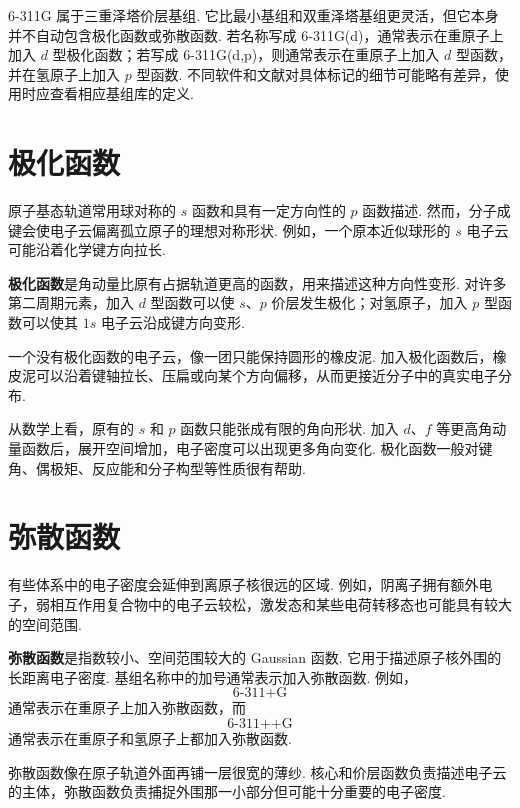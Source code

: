 \documentclass[UTF8,11pt,a4paper,openany]{ctexbook}
\newcommand{\term}[1]{\textbf{#1}}
\begin{document}
6-311G 属于三重泽塔价层基组. 它比最小基组和双重泽塔基组更灵活，但它本身并不自动包含极化函数或弥散函数. 若名称写成 6-311G(d)，通常表示在重原子上加入 $d$ 型极化函数；若写成 6-311G(d,p)，则通常表示在重原子上加入 $d$ 型函数，并在氢原子上加入 $p$ 型函数. 不同软件和文献对具体标记的细节可能略有差异，使用时应查看相应基组库的定义. 

\section{极化函数}

原子基态轨道常用球对称的 $s$ 函数和具有一定方向性的 $p$ 函数描述. 然而，分子成键会使电子云偏离孤立原子的理想对称形状. 例如，一个原本近似球形的 $s$ 电子云可能沿着化学键方向拉长. 

\term{极化函数}是角动量比原有占据轨道更高的函数，用来描述这种方向性变形. 对许多第二周期元素，加入 $d$ 型函数可以使 $s$、$p$ 价层发生极化；对氢原子，加入 $p$ 型函数可以使其 $1s$ 电子云沿成键方向变形. 

\begin{analogybox}
一个没有极化函数的电子云，像一团只能保持圆形的橡皮泥. 加入极化函数后，橡皮泥可以沿着键轴拉长、压扁或向某个方向偏移，从而更接近分子中的真实电子分布. 
\end{analogybox}

从数学上看，原有的 $s$ 和 $p$ 函数只能张成有限的角向形状. 加入 $d$、$f$ 等更高角动量函数后，展开空间增加，电子密度可以出现更多角向变化. 极化函数一般对键角、偶极矩、反应能和分子构型等性质很有帮助. 

\section{弥散函数}

有些体系中的电子密度会延伸到离原子核很远的区域. 例如，阴离子拥有额外电子，弱相互作用复合物中的电子云较松，激发态和某些电荷转移态也可能具有较大的空间范围. 

\term{弥散函数}是指数较小、空间范围较大的 Gaussian 函数. 它用于描述原子核外围的长距离电子密度. 基组名称中的加号通常表示加入弥散函数. 例如，
\[
\text{6-311+G}
\]
通常表示在重原子上加入弥散函数，而
\[
\text{6-311++G}
\]
通常表示在重原子和氢原子上都加入弥散函数. 

\begin{analogybox}
弥散函数像在原子轨道外面再铺一层很宽的薄纱. 核心和价层函数负责描述电子云的主体，弥散函数负责捕捉外围那一小部分但可能十分重要的电子密度. 
\end{analogybox}
\end{document}
